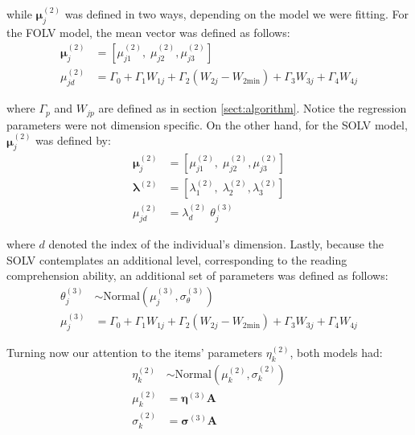 \noindent while $\boldsymbol{\mu}^{(2)}_{j}$ was defined in two ways, depending on the model we were fitting. For the FOLV model, the mean vector was defined as follows:
%
\begin{align}
	\boldsymbol{\mu}^{(2)}_{j} &= \left[ \mu^{(2)}_{j1}, \; \mu^{(2)}_{j2}, \mu^{(2)}_{j3} \right] \label{eq:mu_FOLV} \\
	\mu^{(2)}_{jd} &= \Gamma_{0} + \Gamma_{1} W_{1j} + \Gamma_{2} (W_{2j} - W_{2\text{min}}) + \Gamma_{3} W_{3j} + \Gamma_{4} W_{4j}
\end{align}

\noindent where $\Gamma_{p}$ and $W_{jp}$ are defined as in section \ref{sect:algorithm}. Notice the regression parameters were not dimension specific. On the other hand, for the SOLV model, $\boldsymbol{\mu}^{(2)}_{j}$ was defined by:
%
\begin{align}
	\boldsymbol{\mu}^{(2)}_{j} &= \left[ \mu^{(2)}_{j1}, \; \mu^{(2)}_{j2}, \mu^{(2)}_{j3} \right] \\
	\pmb{\lambda}^{(2)} &= \left[ \lambda^{(2)}_{1}, \; \lambda^{(2)}_{2}, \lambda^{(2)}_{3} \right] \\
	\mu^{(2)}_{jd} &= \lambda^{(2)}_{d} \; \theta^{(3)}_{j} 
\end{align}

\noindent where $d$ denoted the index of the individual's dimension. Lastly, because the SOLV contemplates an additional level, corresponding to the reading comprehension ability, an additional set of parameters was defined as follows:
%
\begin{align}
	\theta^{(3)}_{j} &\sim \text{Normal} \left( \mu^{(3)}_{j}, \sigma^{(3)}_{\theta} \right) \label{eq:theta} \\
	\mu^{(3)}_{j} &=  \Gamma_{0} + \Gamma_{1} W_{1j} + \Gamma_{2} (W_{2j} - W_{2\text{min}}) + \Gamma_{3} W_{3j} + \Gamma_{4} W_{4j} \label{eq:mu_SOLV}
\end{align}

Turning now our attention to the items' parameters $\eta^{(2)}_{k}$, both models had:
%
\begin{align}
	\eta^{(2)}_{k} &\sim \text{Normal} \left( \mu^{(2)}_{k}, \sigma^{(2)}_{k} \right) \label{eq:items} \\
	\mu^{(2)}_{k} &= \pmb{\eta}^{(3)} \mathbf{A} \label{eq:mu_items} \\
	\sigma^{(2)}_{k} &= \pmb{\sigma}^{(3)} \mathbf{A} \label{eq:sigma_items}
\end{align}

